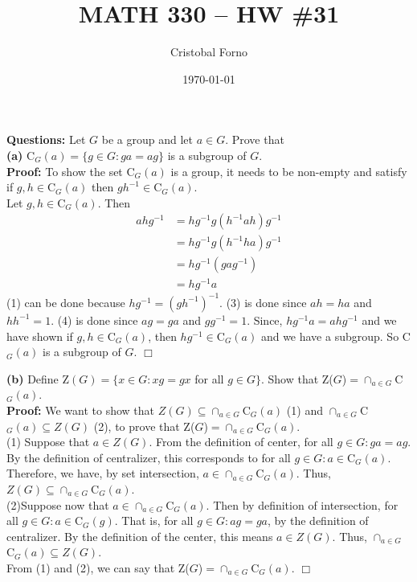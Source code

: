 \documentclass[12pt]{article}
\title{MATH 330 -- HW \#31}
\author{Cristobal Forno}
\date{\today}
\begin{document}
\maketitle

\textbf{Questions:} Let $G$ be a group and let $a \in G$. Prove that\\
\textbf{(a)} C$_{G}(a) = \{g \in G : ga = ag\}$ is a subgroup of $G$.\\
\textbf{Proof:} To show the set C$_G(a)$ is a group, it needs to be non-empty and
satisfy if $g,h \in $C$_G(a)$ then $gh^{-1} \in $C$_G(a)$.\\

Let $g,h \in $C$_G(a)$. Then
\begin{align}
  ahg^{-1} &= hg^{-1}g(h^{-1}ah)g^{-1} \\
           &= hg^{-1}g(h^{-1}ha)g^{-1} \\
           &= hg^{-1}(gag^{-1}) \\
           &= hg^{-1}a
\end{align}
(1) can be done because $hg^{-1} = (gh^{-1})^{-1}$. (3) is done since $ah=ha$
and $hh^{-1}=1$. (4) is done since $ag=ga$ and $gg^{-1} = 1$. Since, $hg^{-1}a =
ahg^{-1}$ and we have shown if $g,h \in$C$_G(a)$, then $hg^{-1} \in $C$_G(a)$ and we
have a subgroup. So C$_G(a)$ is a subgroup of $G$. $\Box$

\textbf{(b)} Define Z$(G) = \{x \in G: xg = gx $ for all $g \in G\}$. Show that Z($G$)$=
\cap_{a \in G}$C$_{G}(a)$. \\

\textbf{Proof:} We want to show that $Z(G) \subseteq \cap_{a \in G}$C$_{G}(a)$
(1) and $\cap_{a \in G}$C$_{G}(a) \subseteq Z(G)$ (2), to prove that  Z($G$)$=
\cap_{a \in G}$C$_{G}(a)$.\\

(1) Suppose that $a \in Z(G)$. From the definition of center, for all $g \in G :
ga = ag$. By the definition of centralizer, this corresponds to for all $g \in G
: a \in $C$_{G}(a)$. Therefore, we have, by set intersection, $a
\in \cap_{a \in G}$C$_{G}(a)$. Thus, $Z(G) \subseteq \cap_{a \in
  G}$C$_{G}(a)$.\\

(2)Suppose now that $a \in \cap_{a \in G}$C$_G(a)$. Then by definition of
intersection, for all $g \in G : a \in $C$_G(g)$. That is, for all $g \in G :
ag=ga$, by the definition of centralizer. By the definition of the center, this
means $a \in Z(G)$. Thus, $\cap_{a \in G}$C$_{G}(a) \subseteq Z(G)$.\\

From (1) and (2), we can say that Z($G$)$= \cap_{a \in G}$C$_{G}(a)$. $\Box$
\end{document}
